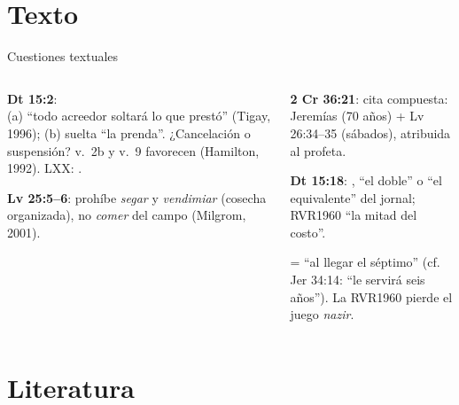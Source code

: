 \section{Texto}

\begin{frame}{Cuestiones textuales}
\begin{columns}[t,onlytextwidth]
\begin{column}{0.49\textwidth}\scriptsize
\textbf{\color{tierraroja}Dt 15:2}: \\
(a) ``todo acreedor soltará lo que prestó'' (Tigay, 1996); (b) suelta ``la prenda''. ¿Cancelación o suspensión? v.~2b y v.~9 favorecen  (Hamilton, 1992). LXX: .\par\medskip
\textbf{\color{tierraroja}Lv 25:5--6}: prohíbe \emph{segar} y \emph{vendimiar} (cosecha organizada), no \emph{comer} del campo (Milgrom, 2001).
\end{column}
\begin{column}{0.49\textwidth}\scriptsize
\textbf{\color{tierraroja}2 Cr 36:21}: cita compuesta: Jeremías (70 años) + Lv 26:34--35 (sábados), atribuida al profeta.\par\medskip
\textbf{\color{tierraroja}Dt 15:18}: , ``el doble'' o ``el equivalente'' del jornal; RVR1960 ``la mitad del costo''.\par\medskip
\begin{tcolorbox}[colback=mostaza!12,colframe=mostaza!85!tierraroja,boxrule=0.6pt,arc=2pt,left=3pt,right=3pt,top=2pt,bottom=2pt,title=Precisión textual,fonttitle=\bfseries\scriptsize,coltitle=caferojizo,colbacktitle=mostaza!30]
 = ``al llegar el séptimo'' (cf. Jer 34:14: ``le servirá seis años''). La RVR1960 pierde el juego \emph{nazir}.
\end{tcolorbox}
\end{column}
\end{columns}
\end{frame}

\section{Literatura}

